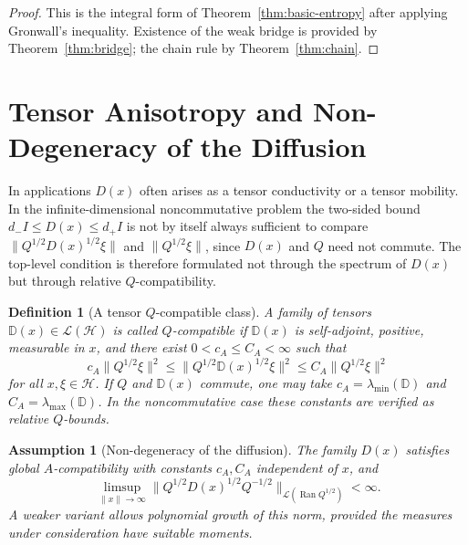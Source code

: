 \documentclass{article}
\newtheorem{assumption}[theorem]{Assumption}
\newtheorem{definition}[theorem]{Definition}
\newcommand{\Hh}{\mathcal H}
\newcommand{\LL}{\mathcal L}
\newcommand{\Ran}{\operatorname{Ran}}
\begin{document}
\begin{proof}
This is the integral form of Theorem~\ref{thm:basic-entropy} after applying
Gronwall's inequality. Existence of the weak bridge is provided by
Theorem~\ref{thm:bridge}; the chain rule by Theorem~\ref{thm:chain}.
\end{proof}


\section{Tensor Anisotropy and Non-Degeneracy of the Diffusion}
\label{sec:tensor-nondeg}

In applications \(D(x)\) often arises as a tensor conductivity or a tensor
mobility. In the infinite-dimensional noncommutative problem the two-sided
bound \(d_-I\le D(x)\le d_+I\) is not by itself always sufficient to compare
\(\|Q^{1/2}D(x)^{1/2}\xi\|\) and \(\|Q^{1/2}\xi\|\), since \(D(x)\) and \(Q\)
need not commute. The top-level condition is therefore formulated not through
the spectrum of \(D(x)\) but through relative \(Q\)-compatibility.

\begin{definition}[A tensor \(Q\)-compatible class]
\label{def:tensor-compatible}
A family of tensors \(\mathbb D(x)\in\LL(\Hh)\) is called \(Q\)-compatible if
\(\mathbb D(x)\) is self-adjoint, positive, measurable in \(x\), and there
exist \(0<c_A\le C_A<\infty\) such that
\[
        c_A\|Q^{1/2}\xi\|^2
        \le
        \|Q^{1/2}\mathbb D(x)^{1/2}\xi\|^2
        \le
        C_A\|Q^{1/2}\xi\|^2
\]
for all \(x,\xi\in\Hh\). If \(Q\) and \(\mathbb D(x)\) commute, one may take
\(c_A=\lambda_{\min}(\mathbb D)\) and \(C_A=\lambda_{\max}(\mathbb D)\). In
the noncommutative case these constants are verified as relative
\(Q\)-bounds.
\end{definition}

\begin{assumption}[Non-degeneracy of the diffusion]
\label{ass:no-diff-degeneration}
The family \(D(x)\) satisfies global \(A\)-compatibility with constants
\(c_A,C_A\) independent of \(x\), and
\[
        \limsup_{\|x\|\to\infty}
        \|Q^{1/2}D(x)^{1/2}Q^{-1/2}\|_{\LL(\Ran Q^{1/2})}<\infty .
\]
A weaker variant allows polynomial growth of this norm, provided the measures under consideration have suitable moments.
\end{assumption}
\end{document}
